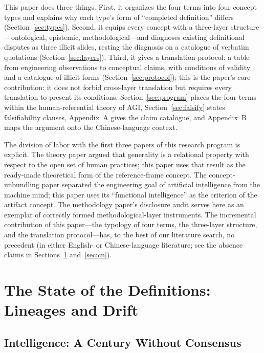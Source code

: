 \documentclass[10pt]{article}
\begin{document}
This paper does three things. First, it organizes the four terms into four concept types and explains why each type's form of ``completed definition'' differs (Section~\ref{sec:types}). Second, it equips every concept with a three-layer structure---ontological, epistemic, methodological---and diagnoses existing definitional disputes as three illicit slides, resting the diagnosis on a catalogue of verbatim quotations (Section~\ref{sec:layers}). Third, it gives a translation protocol: a table from engineering observations to conceptual claims, with conditions of validity and a catalogue of illicit forms (Section~\ref{sec:protocol}); this is the paper's core contribution: it does not forbid cross-layer translation but requires every translation to present its conditions. Section~\ref{sec:program} places the four terms within the human-referential theory of AGI, Section~\ref{sec:falsify} states falsifiability clauses, Appendix~A gives the claim catalogue, and Appendix~B maps the argument onto the Chinese-language context.

The division of labor with the first three papers of this research program is explicit. The theory paper argued that generality is a relational property with respect to the open set of human practices\cite{yu2026theory}; this paper uses that result as the ready-made theoretical form of the reference-frame concept. The concept-unbundling paper separated the engineering goal of artificial intelligence from the machine mind\cite{yu2026twogoals}; this paper uses its ``functional intelligence'' as the criterion of the artifact concept. The methodology paper's disclosure audit\cite{yu2026methodology} serves here as an exemplar of correctly formed methodological-layer instruments. The incremental contribution of this paper---the typology of four terms, the three-layer structure, and the translation protocol---has, to the best of our literature search, no precedent (in either English- or Chinese-language literature; see the absence claims in Sections~\ref{sec:survey} and~\ref{sec:cn}).

\section{The State of the Definitions: Lineages and Drift}\label{sec:survey}

\subsection{Intelligence: A Century Without Consensus}
\end{document}
